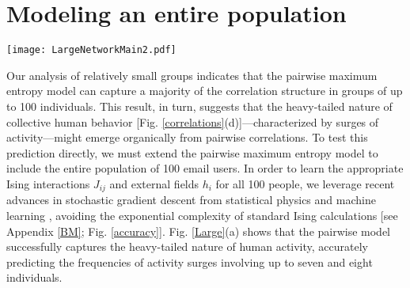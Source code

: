 \documentclass[aps,reprint,superscriptaddress,amsmath,amssymb,longbibliography]{revtex4-1}
\begin{document}
\section{Modeling an entire population}

\begin{figure*}
\texttt{[image: LargeNetworkMain2.pdf]}
\caption{\label{Large} Surges of collective activity are captured by pairwise correlations. (a) Distribution of the observed number of emails in a given two-minute window (black), the prediction of the independent model (blue), and the prediction of the pairwise maximum entropy model (red). (b) Scatter plot illustrating the relationship between the observed pairwise correlations in the data $\rho_{ij}$ and the learned Ising interactions $J_{ij}$ for all pairs in the 100-person population. Inset: Histogram of the learned interactions.}
\end{figure*}

Our analysis of relatively small groups indicates that the pairwise maximum entropy model can capture a majority of the correlation structure in groups of up to 100 individuals. This result, in turn, suggests that the heavy-tailed nature of collective human behavior [Fig. \ref{correlations}(d)]---characterized by surges of activity---might emerge organically from pairwise correlations. To test this prediction directly, we must extend the pairwise maximum entropy model to include the entire population of 100 email users. In order to learn the appropriate Ising interactions $J_{ij}$ and external fields $h_i$ for all 100 people, we leverage recent advances in stochastic gradient descent from statistical physics \cite{Ferrenberg-01} and machine learning \cite{Ackley-01}, avoiding the exponential complexity of standard Ising calculations [see Appendix \ref{BM}; Fig. \ref{accuracy}]. Fig. \ref{Large}(a) shows that the pairwise model successfully captures the heavy-tailed nature of human activity, accurately predicting the frequencies of activity surges involving up to seven and eight individuals.
\end{document}
